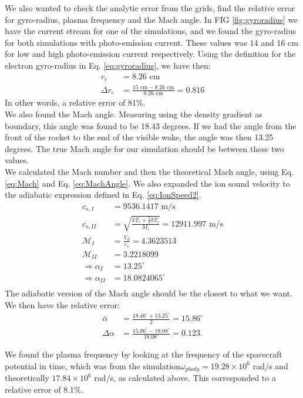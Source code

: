 \documentclass[aip, 
rsi, 
amsmath,
amssymb,
longbibliography,
preprint]{revtex4-1}
\begin{document}
We also wanted to check the analytic error from the grids, find the relative error for gyro-radius, plasma frequency and the Mach angle. In FIG \ref{fig:gyroradius} we have the current stream for one of the simulations, and we found the gyro-radius for both simulations with photo-emission current. These values was $14$ and $16$ cm for low and high photo-emission current respectively. Using the definition for the electron gyro-radius in Eq. \ref{eq:gyroradius}, we have then:
\begin{align*}
r_e &= 8.26 \, \, \text{cm}\\
\Delta r_e &= \frac{15 \, \, \text{cm}- 8.26 \, \, \text{cm}}{8.26 \, \, \text{cm}} = 0.816
\end{align*}
In other words, a relative error of 81\%.\\

We also found the Mach angle. Measuring using the density gradient as boundary, this angle was found to be 18.43 degrees. If we had the angle from the front of the rocket to the end of the visible wake, the angle was then 13.25 degrees. The true Mach angle for our simulation should be between these two values.\\

We calculated the Mach number and then the theoretical Mach angle, using Eq. \ref{eq:Mach} and Eq. \ref{eq:MachAngle}. We also expanded the ion sound velocity to the adiabatic expression defined in Eq. \ref{eq:IonSpeed2}.
\begin{align*}
c_{s,I} &= 9536.1417 \, \, \text{m/s}\\
c_{s,II} &= \sqrt{\frac{kT_e + \frac{5}{3} k T_i}{ M_i}} = 12911.997 \, \, \text{m/s}\\
\mathcal{M}_{I} &= \frac{V_d}{c_s} = 4.3623513\\
\mathcal{M}_{II} &= 3.2218099\\
\Rightarrow \alpha_{I} &= 13.25 ^{\circ}\\
\Rightarrow \alpha_{II} &= 18.0824065 ^{\circ}\\
\end{align*}
The adiabatic version of the Mach angle should be the closest to what we want. We then have the relative error:
\begin{align*}
\bar{\alpha} &= \frac{18.46^{\circ} + 13.25^{\circ}}{2} = 15.86^{\circ}\\
\Delta \alpha &= \frac{15.86 ^{\circ}- 18.08^{\circ}}{18.08^{\circ}} = 0.123.
\end{align*}

We found the plasma frequency by looking at the frequency of the spacecraft potential in time, which was from the simulation$\omega_{pbody} = 19.28\times10^{6}$ rad/s and theoretically $17.84\times 10^{6}$ rad/s, as calculated above. This corresponded to a relative error of 8.1\%.
\end{document}
